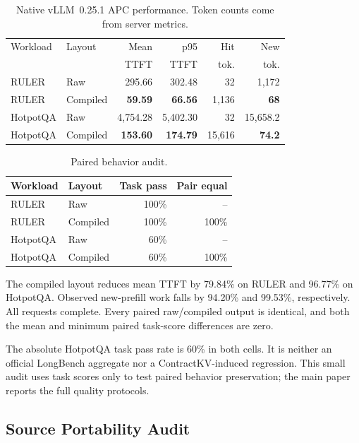 \documentclass[journal]{IEEEtran}
\begin{document}
\begin{table}[H]
\centering
\caption{Native vLLM~0.25.1 APC performance. Token counts come from server metrics.}
\label{tab:vllm025-results}
\scriptsize
\setlength{\tabcolsep}{2.7pt}
\begin{tabular}{llrrrr}
\toprule
Workload & Layout & Mean & p95 & Hit & New \\
 & & TTFT & TTFT & tok. & tok. \\
\midrule
RULER & Raw & 295.66 & 302.48 & 32 & 1,172 \\
RULER & Compiled & \textbf{59.59} & \textbf{66.56} &
1,136 & \textbf{68} \\
HotpotQA & Raw & 4,754.28 & 5,402.30 & 32 & 15,658.2 \\
HotpotQA & Compiled & \textbf{153.60} & \textbf{174.79} &
15,616 & \textbf{74.2} \\
\bottomrule
\end{tabular}
\end{table}

\begin{table}[H]
\centering
\caption{Paired behavior audit.}
\label{tab:vllm025-quality}
\small
\begin{tabular}{llrr}
\toprule
Workload & Layout & Task pass & Pair equal \\
\midrule
RULER & Raw & 100\% & -- \\
RULER & Compiled & 100\% & 100\% \\
HotpotQA & Raw & 60\% & -- \\
HotpotQA & Compiled & 60\% & 100\% \\
\bottomrule
\end{tabular}
\end{table}

The compiled layout reduces mean TTFT by 79.84\% on RULER and 96.77\% on
HotpotQA. Observed new-prefill work falls by 94.20\% and 99.53\%,
respectively. All requests complete. Every paired raw/compiled output is
identical, and both the mean and minimum paired task-score differences are
zero.

The absolute HotpotQA task pass rate is 60\% in both cells. It is neither an
official LongBench aggregate nor a ContractKV-induced regression. This small
audit uses task scores only to test paired behavior preservation; the main
paper reports the full quality protocols.

\subsection{Source Portability Audit}
\end{document}

